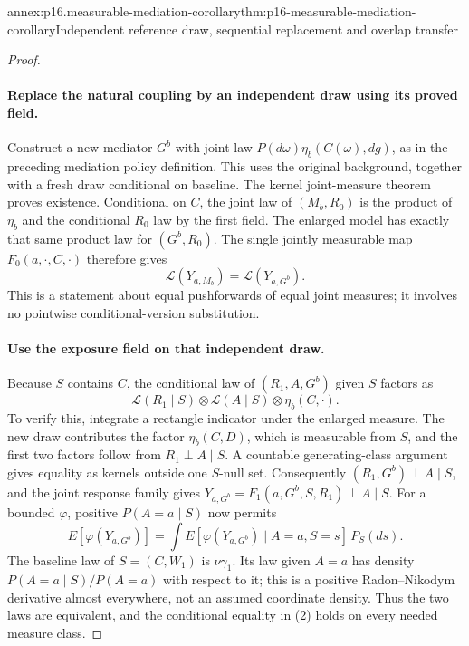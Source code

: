 \begin{annexitem}{annex:p16.measurable-mediation-corollary}{thm:p16-measurable-mediation-corollary}{Independent reference draw, sequential replacement and overlap transfer}
\begin{proof}
\paragraph{Replace the natural coupling by an independent draw using its proved field.}
Construct a new mediator \(G^b\) with joint law
\(P(d\omega)\eta_b(C(\omega),dg)\), as in the preceding mediation
policy definition. This uses the original background, together with a
fresh draw conditional on baseline. The kernel joint-measure theorem
proves existence. Conditional on \(C\), the joint law of
\((M_b,R_0)\) is the product of \(\eta_b\) and the conditional
\(R_0\) law by the first field. The enlarged model has exactly that
same product law for \((G^b,R_0)\). The single jointly measurable
map \(F_0(a,\cdot,C,\cdot)\) therefore gives
\[
 \mathcal L(Y_{a,M_b})=\mathcal L(Y_{a,G^b}).               \tag{1}
\]
This is a statement about equal pushforwards of equal joint measures;
it involves no pointwise conditional-version substitution.

\paragraph{Use the exposure field on that independent draw.}
Because \(S\) contains \(C\), the conditional law of
\((R_1,A,G^b)\) given \(S\) factors as
\[
 \mathcal L(R_1\mid S)\otimes\mathcal L(A\mid S)
                         \otimes\eta_b(C,\cdot).
\]
To verify this, integrate a rectangle indicator under the enlarged
measure. The new draw contributes the factor \(\eta_b(C,D)\),
which is measurable from \(S\), and the first two factors follow
from \(R_1\perp A\mid S\). A countable generating-class argument
gives equality as kernels outside one \(S\)-null set. Consequently
\((R_1,G^b)\perp A\mid S\), and the joint response family gives
\(Y_{a,G^b}=F_1(a,G^b,S,R_1)\perp A\mid S\).
For a bounded \(\varphi\), positive \(P(A=a\mid S)\) now permits
\[
 E[\varphi(Y_{a,G^b})]
 =\int E[\varphi(Y_{a,G^b})\mid A=a,S=s]\,P_S(ds).         \tag{2}
\]
The baseline law of \(S=(C,W_1)\) is \(\nu\gamma_1\).
Its law given \(A=a\) has density
\(P(A=a\mid S)/P(A=a)\) with respect to it; this is a positive
Radon--Nikodym derivative almost everywhere, not an assumed coordinate
density. Thus the two laws are equivalent, and the conditional equality
in (2) holds on every needed measure class.


\end{proof}
\end{annexitem}
